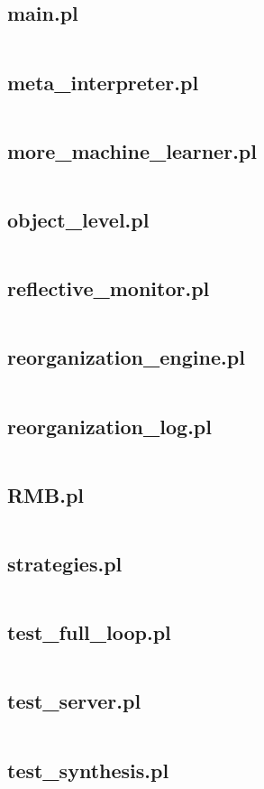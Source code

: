\documentclass{article}
\begin{document}
\subsection{main.pl}
\inputminted{prolog}{main.pl}
\subsection{meta\_interpreter.pl}
\inputminted{prolog}{meta_interpreter.pl}
\subsection{more\_machine\_learner.pl}
\inputminted{prolog}{more_machine_learner.pl}
\subsection{object\_level.pl}
\inputminted{prolog}{object_level.pl}
\subsection{reflective\_monitor.pl}
\inputminted{prolog}{reflective_monitor.pl}
\subsection{reorganization\_engine.pl}
\inputminted{prolog}{reorganization_engine.pl}
\subsection{reorganization\_log.pl}
\inputminted{prolog}{reorganization_log.pl}
\subsection{RMB.pl}
\inputminted{prolog}{RMB.pl}
\subsection{strategies.pl}
\inputminted{prolog}{strategies.pl}
\subsection{test\_full\_loop.pl}
\inputminted{prolog}{test_full_loop.pl}
\subsection{test\_server.pl}
\inputminted{prolog}{test_server.pl}
\subsection{test\_synthesis.pl}
\inputminted{prolog}{test_synthesis.pl}
\end{document}
